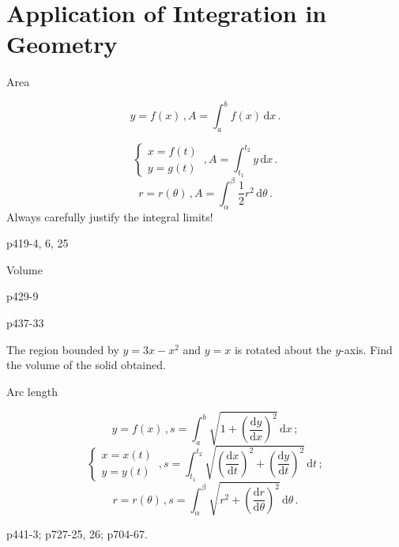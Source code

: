 \section[AppofInt1]{Application of Integration in Geometry}
\begin{frame}{Area}


\[
y=f\left(x\right)\,,A=\int_{a}^{b}f\left(x\right)\,\mathrm{d}x\,.
\]



\[
\begin{cases}
x=f\left(t\right)\\
y=g\left(t\right)
\end{cases}\,,A=\int_{t_{1}}^{t_{2}}y\,\mathrm{d}x\,.
\]
\[
r=r\left(\theta\right)\,,A=\int_{\alpha}^{\beta}\frac{1}{2}r^{2}\,\mathrm{d}\theta\,.
\]
Always carefully justify the integral limits!
\begin{example}
p419-4, 6, 25
\end{example}

\end{frame}

\begin{frame}{Volume}

\begin{example}
p429-9
\end{example}

\begin{example}
p437-33
\end{example}

\begin{example}
The region bounded by $y=3x-x^{2}$ and $y=x$ is rotated about the
$y$-axis. Find the volume of the solid obtained.
\end{example}

\end{frame}

\begin{frame}{Arc length}


\[
y=f\left(x\right)\,,s=\int_{a}^{b}\sqrt{1+\left(\frac{\mathrm{d}y}{\mathrm{d}x}\right)^{2}}\,\mathrm{d}x\,;
\]
\[
\begin{cases}
x=x\left(t\right)\\
y=y\left(t\right)
\end{cases}\,,s=\int_{t_{1}}^{t_{2}}\sqrt{\left(\frac{\mathrm{d}x}{\mathrm{d}t}\right)^{2}+\left(\frac{\mathrm{d}y}{\mathrm{d}t}\right)^{2}}\,\mathrm{d}t\,;
\]
\[
r=r\left(\theta\right)\,,s=\int_{\alpha}^{\beta}\sqrt{r^{2}+\left(\frac{\mathrm{d}r}{\mathrm{d}\theta}\right)^{2}}\,\mathrm{d}\theta\,.
\]

\begin{example}
p441-3; p727-25, 26; p704-67.
\end{example}

\end{frame}

